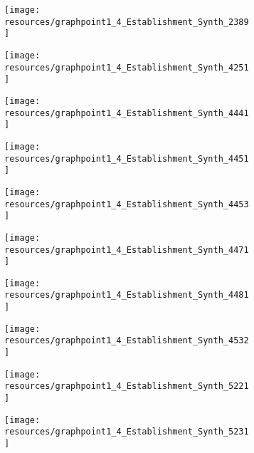 \documentclass[12pt]{article}
\begin{document}
\begin{figure}[H]
	\centering
	\begin{subfigure}[b]{0.4\textwidth}
	    \texttt{[image: resources/graphpoint1\_4\_Establishment\_Synth\_2389]}
	\end{subfigure}
	\begin{subfigure}[b]{0.4\textwidth}
	    \texttt{[image: resources/graphpoint1\_4\_Establishment\_Synth\_4251]}
	\end{subfigure}
\end{figure}

\begin{figure}[H]
	\centering
	\begin{subfigure}[b]{0.4\textwidth}
	    \texttt{[image: resources/graphpoint1\_4\_Establishment\_Synth\_4441]}
	\end{subfigure}
	\begin{subfigure}[b]{0.4\textwidth}
	    \texttt{[image: resources/graphpoint1\_4\_Establishment\_Synth\_4451]}
	\end{subfigure}
\end{figure}

\begin{figure}[H]
	\centering
	\begin{subfigure}[b]{0.4\textwidth}
	    \texttt{[image: resources/graphpoint1\_4\_Establishment\_Synth\_4453]}
	\end{subfigure}
	\begin{subfigure}[b]{0.4\textwidth}
	    \texttt{[image: resources/graphpoint1\_4\_Establishment\_Synth\_4471]}
	\end{subfigure}
\end{figure}

\begin{figure}[H]
	\centering
	\begin{subfigure}[b]{0.4\textwidth}
	    \texttt{[image: resources/graphpoint1\_4\_Establishment\_Synth\_4481]}
	\end{subfigure}
	\begin{subfigure}[b]{0.4\textwidth}
	    \texttt{[image: resources/graphpoint1\_4\_Establishment\_Synth\_4532]}
	\end{subfigure}
\end{figure}

\begin{figure}[H]
	\centering
	\begin{subfigure}[b]{0.4\textwidth}
	    \texttt{[image: resources/graphpoint1\_4\_Establishment\_Synth\_5221]}
	\end{subfigure}
	\begin{subfigure}[b]{0.4\textwidth}
	    \texttt{[image: resources/graphpoint1\_4\_Establishment\_Synth\_5231]}
	\end{subfigure}
\end{figure}
\end{document}
